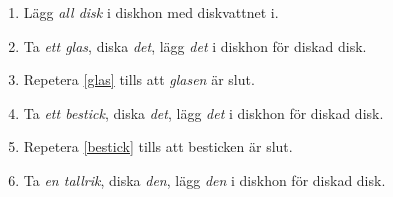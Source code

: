 \begin{frame}
  \begin{example}
    \begin{enumerate}
      \item \alert{Lägg} \emph{all disk} i diskhon med diskvattnet i.
      \item \label{glas} \alert{Ta} \emph{ett glas}, \alert{diska} \emph{det}, 
        \alert{lägg} \emph{det} i diskhon för diskad disk.
      \item Repetera \ref{glas} tills att \emph{glasen} är slut.
      \item \label{bestick} \alert{Ta} \emph{ett bestick}, \alert{diska} 
        \emph{det}, \alert{lägg} \emph{det} i diskhon för diskad disk.
      \item Repetera \ref{bestick} tills att besticken är slut.
      \item \alert{Ta} \emph{en tallrik}, \alert{diska} \emph{den}, 
        \alert{lägg} \emph{den} i diskhon för diskad disk.
    \end{enumerate}
  \end{example}
\end{frame}

